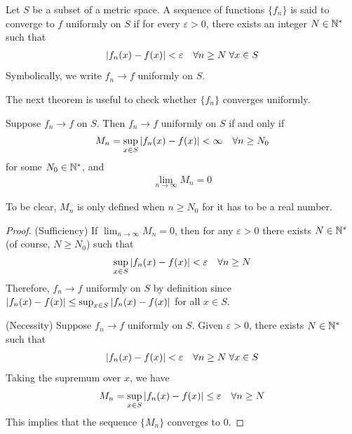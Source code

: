 \documentclass[thmcnt=section, 12pt]{my-elegantbook}
\begin{document}
\begin{definition}
    Let $S$ be a subset of a metric space. A sequence of functions $\{f_n\}$ is said to converge to $f$ uniformly on $S$ if for every $\varepsilon > 0$, there exists an integer $N \in \mathbb{N}^\ast$ such that 
    \begin{align*}
        \left\lvert f_n(x) - f(x) \right\rvert < \varepsilon
        \quad \forall n \geq N \;
        \forall x \in S
    \end{align*}
    Symbolically, we write $f_n \to f$ uniformly on $S$.
\end{definition}


The next theorem is useful to check whether $\{f_n\}$ converges uniformly.

\begin{theorem} \label{thm:46}
    Suppose $f_n \to f$ on $S$. Then $f_n \to f$ uniformly on $S$ if and only if
    \begin{align*}
        M_n = \sup_{x \in S} \left\lvert f_n(x) - f(x) \right\rvert < \infty
        \quad \forall n \geq N_0
    \end{align*}
    for some $N_0 \in \mathbb{N}^\ast$, and 
    \begin{align*}
        \lim_{n \to \infty} M_n = 0
    \end{align*}
\end{theorem}

\begin{note}
    To be clear, $M_n$ is only defined when $n \geq N_0$ for it has to be a real number.
\end{note}

\begin{proof}
    (Sufficiency) If $\lim_{n \to \infty} M_n = 0$, then for any $\varepsilon > 0$ there exists $N \in \mathbb{N}^\ast$ (of course, $N \geq N_0$) such that 
    \begin{align*}
        \sup_{x \in S} \left\lvert f_n(x) - f(x) \right\rvert < \varepsilon
        \quad \forall n \geq N
    \end{align*}
    Therefore, $f_n \to f$ uniformly on $S$ by definition since $\left\lvert f_n(x) - f(x) \right\rvert \leq \sup_{x \in S} \left\lvert f_n(x) - f(x) \right\rvert$ for all $x \in S$.

    (Necessity) Suppose $f_n \to f$ uniformly on $S$. Given $\varepsilon > 0$, there exists $N \in \mathbb{N}^\ast$ such that 
    \begin{align*}
        \left\lvert f_n(x) - f(x) \right\rvert < \varepsilon
        \quad \forall n \geq N \; 
        \forall x \in S
    \end{align*}
    Taking the supremum over $x$, we have 
    \begin{align*}
        M_n
        = \sup_{x \in S} \left\lvert f_n(x) - f(x) \right\rvert \leq \varepsilon
        \quad \forall n \geq N
    \end{align*}
    This implies that the sequence $\{M_n\}$ converges to $0$.
\end{proof}
\end{document}
